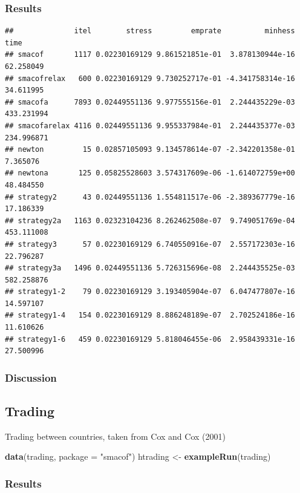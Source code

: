 \documentclass[
  12pt,
]{article}
\newenvironment{Shaded}{\begin{snugshade}}{\end{snugshade}}
\newcommand{\AttributeTok}[1]{\textcolor[rgb]{0.13,0.29,0.53}{#1}}
\newcommand{\FunctionTok}[1]{\textcolor[rgb]{0.13,0.29,0.53}{\textbf{#1}}}
\newcommand{\NormalTok}[1]{#1}
\newcommand{\OtherTok}[1]{\textcolor[rgb]{0.56,0.35,0.01}{#1}}
\newcommand{\StringTok}[1]{\textcolor[rgb]{0.31,0.60,0.02}{#1}}
\begin{document}
\subsubsection{Results}\label{results-4}

\begin{verbatim}
##              itel        stress         emprate          minhess       time
## smacof       1117 0.02230169129 9.861521851e-01  3.878130944e-16  62.258049
## smacofrelax   600 0.02230169129 9.730252717e-01 -4.341758314e-16  34.611995
## smacofa      7893 0.02449551136 9.977555156e-01  2.244435229e-03 433.231994
## smacofarelax 4116 0.02449551136 9.955337984e-01  2.244435377e-03 234.996871
## newton         15 0.02857105093 9.134578614e-07 -2.342201358e-01   7.365076
## newtona       125 0.05825528603 3.574317609e-06 -1.614072759e+00  48.484550
## strategy2      43 0.02449551136 1.554811517e-06 -2.389367779e-16  17.186339
## strategy2a   1163 0.02323104236 8.262462508e-07  9.749051769e-04 453.111008
## strategy3      57 0.02230169129 6.740550916e-07  2.557172303e-16  22.796287
## strategy3a   1496 0.02449551136 5.726315696e-08  2.244435525e-03 582.258876
## strategy1-2    79 0.02230169129 3.193405904e-07  6.047477807e-16  14.597107
## strategy1-4   154 0.02230169129 8.886248189e-07  2.702524186e-16  11.610626
## strategy1-6   459 0.02230169129 5.818046455e-06  2.958439331e-16  27.500996
\end{verbatim}

\subsubsection{Discussion}\label{discussion-4}

\subsection{Trading}\label{trading}

Trading between countries, taken from Cox and Cox (2001)

\begin{Shaded}
\begin{Highlighting}[]
\FunctionTok{data}\NormalTok{(trading, }\AttributeTok{package =} \StringTok{"smacof"}\NormalTok{)}
\NormalTok{htrading }\OtherTok{\textless{}{-}} \FunctionTok{exampleRun}\NormalTok{(trading)}
\end{Highlighting}
\end{Shaded}

\subsubsection{Results}\label{results-5}
\end{document}
